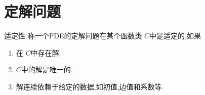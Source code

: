 \documentclass[../../PDE.tex]{subfiles}
\begin{document}
\section{定解问题}

\begin{definition}{适定性}
    称一个PDE的定解问题在某个函数类 \(  C  \)中是适定的,如果
    \begin{enumerate}
        \item 在 \(  C  \)中存在解.
        \item \(  C  \)中的解是唯一的.
        \item 解连续依赖于给定的数据,如初值,边值和系数等.   
    \end{enumerate}
     
\end{definition}
\end{document}
